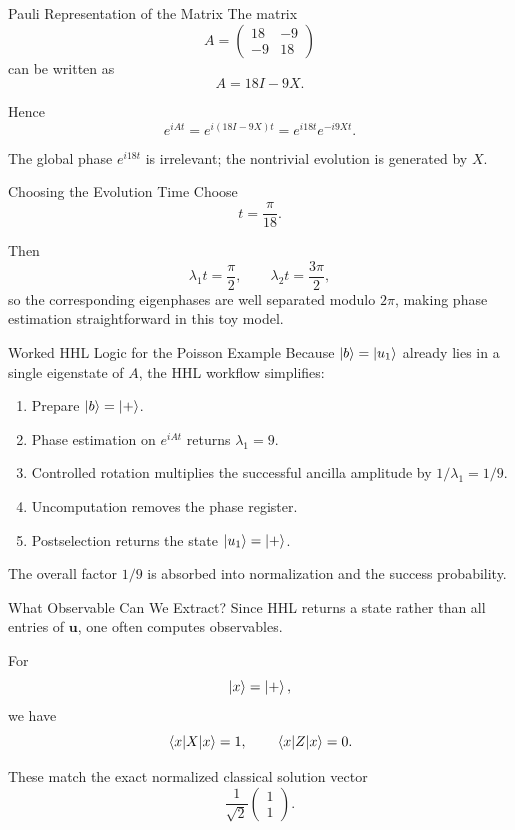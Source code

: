 \documentclass[aspectratio=169]{beamer}
\begin{document}
\begin{frame}{Pauli Representation of the Matrix}
The matrix
\[
A=
\begin{pmatrix}
18 & -9\\
-9 & 18
\end{pmatrix}
\]
can be written as
\[
A = 18 I - 9 X.
\]

Hence
\[
e^{iAt}=e^{i(18I-9X)t}=e^{i18t}e^{-i9Xt}.
\]

The global phase \(e^{i18t}\) is irrelevant; the nontrivial evolution is generated by \(X\).
\end{frame}

\begin{frame}{Choosing the Evolution Time}
Choose
\[
t=\frac{\pi}{18}.
\]

Then
\[
\lambda_1 t = \frac{\pi}{2},
\qquad
\lambda_2 t = \frac{3\pi}{2},
\]
so the corresponding eigenphases are well separated modulo \(2\pi\), making phase estimation straightforward in this toy model.
\end{frame}

\begin{frame}{Worked HHL Logic for the Poisson Example}
Because \(\ket{b}=\ket{u_1}\) already lies in a single eigenstate of \(A\), the HHL workflow simplifies:

\begin{enumerate}
    \item Prepare \(\ket{b}=\ket{+}\).
    \item Phase estimation on \(e^{iAt}\) returns \(\lambda_1=9\).
    \item Controlled rotation multiplies the successful ancilla amplitude by \(1/\lambda_1=1/9\).
    \item Uncomputation removes the phase register.
    \item Postselection returns the state \(\ket{u_1}=\ket{+}\).
\end{enumerate}

The overall factor \(1/9\) is absorbed into normalization and the success probability.
\end{frame}

\begin{frame}{What Observable Can We Extract?}
Since HHL returns a state rather than all entries of \(\bm{u}\), one often computes observables.

For
\[
\ket{x}=\ket{+},
\]
we have
\[
\expval{X}{x}=1,
\qquad
\expval{Z}{x}=0.
\]

These match the exact normalized classical solution vector
\[
\frac{1}{\sqrt{2}}
\begin{pmatrix}
1\\
1
\end{pmatrix}.
\]
\end{frame}
\end{document}
